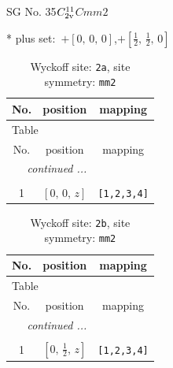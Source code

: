 \documentclass[fleqn,8pt]{jsarticle}
\begin{document}
\setcounter{MaxMatrixCols}{32}

\renewcommand{\tablename}{Table~}
\renewcommand{\figurename}{Figure~}
\begin{center}
\LARGE
SG No. 35\quad$C_{\rm 2v}^{11}$\quad$Cmm2$\quad[ orthorhombic ]
\end{center}
* plus set:\,\,\,$+\left[ 0,\, 0,\, 0 \right]$,\quad $+\left[ \frac{1}{2},\, \frac{1}{2},\, 0 \right]$
\renewcommand{\arraystretch}{1.2}
\begin{longtable}{ccc}
\caption{Wyckoff site: {\tt 2a}, site symmetry: {\tt mm2}}
 \\
 \hline \hline
No. & position & mapping \\ \hline \endfirsthead

\multicolumn{2}{l}{\tablename\ \thetable{}} \\
 \hline \hline
No. & position & mapping \\ \hline \endhead

 \hline \hline
\multicolumn{2}{r}{\footnotesize\it continued ...} \\ \endfoot

 \hline \hline
\multicolumn{2}{r}{} \\ \endlastfoot

1 & $\left[ 0,\, 0,\, z \right]$ & {\tt [1,2,3,4]} \\
\end{longtable}
\renewcommand{\arraystretch}{1.2}
\begin{longtable}{ccc}
\caption{Wyckoff site: {\tt 2b}, site symmetry: {\tt mm2}}
 \\
 \hline \hline
No. & position & mapping \\ \hline \endfirsthead

\multicolumn{2}{l}{\tablename\ \thetable{}} \\
 \hline \hline
No. & position & mapping \\ \hline \endhead

 \hline \hline
\multicolumn{2}{r}{\footnotesize\it continued ...} \\ \endfoot

 \hline \hline
\multicolumn{2}{r}{} \\ \endlastfoot

1 & $\left[ 0,\, \frac{1}{2},\, z \right]$ & {\tt [1,2,3,4]} \\
\end{longtable}
\renewcommand{\arraystretch}{1.2}
\end{document}
